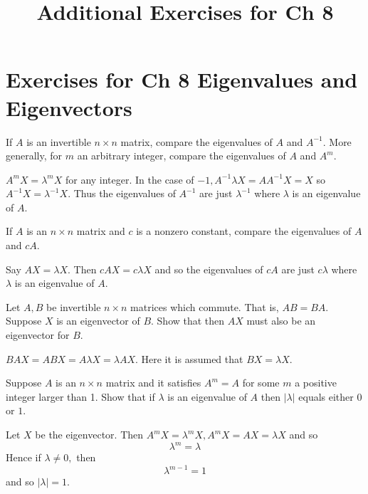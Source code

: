 \documentclass{ximera}
\title{Additional Exercises for Ch 8} \license{CC BY-NC-SA 4.0}
\begin{document}
\begin{abstract}
\end{abstract}
\maketitle

\section*{Exercises for Ch 8 Eigenvalues and Eigenvectors}


\begin{problem}\label{prb:8.1} If $A$ is an invertible $n\times n$ matrix, compare the eigenvalues of
$A$ and $A^{-1}$. More generally, for $m$ an arbitrary integer, compare the
eigenvalues of $A$ and $A^{m}$.
\begin{hint}
$A^{m}X=\lambda ^{m}X$ for
any integer. In the case of $-1,A^{-1}\lambda X=AA^{-1}X=X$
so $A^{-1}X =\lambda ^{-1}X$. Thus the eigenvalues of $A^{-1}$ are just $\lambda ^{-1}$ where $\lambda $ is an eigenvalue of $A$.
\end{hint}
\end{problem}

\begin{problem}\label{prb:8.2} If $A$ is an $n\times n$ matrix and $c$ is a nonzero constant, compare
the eigenvalues of $A$ and $cA$. \vspace{1mm}
\begin{hint}
Say $AX=\lambda X.$ Then $
cAX=c\lambda X$ and so the eigenvalues of $cA$ are just $
c\lambda $ where $\lambda $ is an eigenvalue of $A$.
\end{hint}
\end{problem}

\begin{problem}\label{prb:8.3} Let $A,B$ be invertible $n\times n$ matrices which commute. That is, $AB=BA$. Suppose $X$ is an eigenvector of $B$. Show that then
$AX$ must also be an eigenvector for $B$. \vspace{1mm}
\begin{hint}
 $BAX=ABX
=A\lambda X=\lambda AX$. Here it is assumed that $BX=\lambda X$.
\end{hint}
\end{problem}

\begin{problem}\label{prb:8.4} Suppose $A$ is an $n\times n$ matrix and it satisfies $A^{m}=A$ for
some $m$ a positive integer larger than 1. Show that if $\lambda $ is an
eigenvalue of $A$ then $\left\vert \lambda \right\vert $ equals either 0 or $
1$. \vspace{1mm}
\begin{hint}
Let $X$ be the eigenvector. Then $A^{m}X=\lambda ^{m}
X,A^{m}X=AX=\lambda X$ and so
\[
\lambda ^{m}=\lambda
\]
Hence if $\lambda \neq 0,$ then
\[
\lambda ^{m-1}=1
\]
and so $\left\vert \lambda \right\vert =1.$
\end{hint}
\end{problem}
\end{document}
